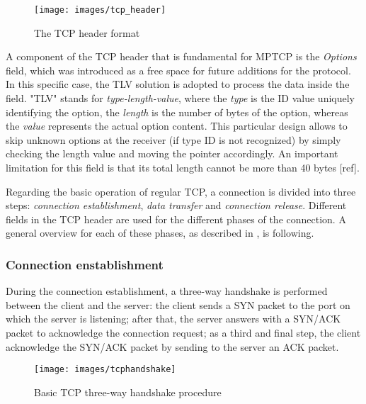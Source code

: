 \begin{figure}[!htb]
\centering
\texttt{[image: images/tcp\_header]}
\caption{The TCP header format}
\label{fig:tcp_header}
\end{figure}

A component of the TCP header that is fundamental for MPTCP is the \textit{Options} field, which was introduced as a free space for future additions for the protocol. In this specific case, the TLV solution is adopted to process the data inside the field. "TLV" stands for \textit{type-length-value}, where the \textit{type} is the ID value uniquely identifying the option, the \textit{length} is the number of bytes of the option, whereas the \textit{value} represents the actual option content. This particular design allows to skip unknown options at the receiver (if type ID is not recognized) by simply checking the length value and moving the pointer accordingly. An important limitation for this field is that its total length cannot be more than 40 bytes [ref].

Regarding the basic operation of regular TCP, a connection is divided into three steps: \textit{connection establishment}, \textit{data transfer} and \textit{connection release}. Different fields in the TCP header are used for the different phases of the connection. A general overview for each of these phases, as described in , is following.

\subsubsection{Connection enstablishment}
During the connection establishment, a  three-way handshake is performed between the client and the server: the client sends a SYN packet to the port on which the server is listening; after that, the server answers with a SYN/ACK packet to acknowledge the connection request; as a third and final step, the client acknowledge the SYN/ACK packet by sending to the server an ACK packet. 

\begin{figure}[!htb]
\centering
\texttt{[image: images/tcphandshake]}
\caption{Basic TCP three-way handshake procedure}
\label{fig:tcphandshake}
\end{figure}

